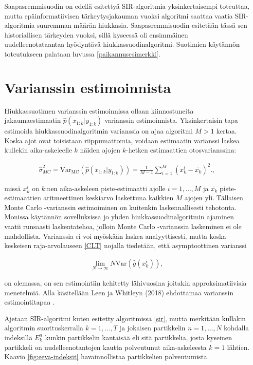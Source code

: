 \documentclass[
  12pt,
  a4paper, twoside]{book}
\begin{document}
Saapasremmisuodin on edellä esitettyä SIR-algoritmia yksinkertaisempi toteuttaa, mutta epäinformatiivisen tärkeytysjakauman vuoksi algoritmi saattaa vaatia SIR-algoritmia suuremman määrän hiukkasia. Saapasremmisuodin esitetään tässä sen historiallisen tärkeyden vuoksi, sillä kyseessä oli ensimmäinen uudelleenotataantaa hyödyntävä hiukkassuodinalgoritmi. Suotimien käytännön toteutukseen palataan luvussa \ref{paikannusesimerkki}.

\section{Varianssin estimoinnista} \label{varianssin-estimointi}

Hiukkassuotimen varianssin estimoinnissa ollaan kiinnostuneita jakaumaestimaatin \(\hat{p}(x_{1:k}|y_{1:k})\) varianssin estimoinnista. Yksinkertaisin tapa estimoida hiukkassuodinalgoritmin varianssia on ajaa algoritmi \(M > 1\) kertaa. Koska ajot ovat toisistaan riippumattomia, voidaan estimaatin varianssi laskea kullekin aika-askeleelle \(k\) näiden ajojen \(k\)-hetken estimaattien otosvarianssina:

\begin{align}\label{MC-varianssi}
\hat{\sigma}^2_{MC} = \text{Var}_{\text{MC}}(\hat{p}(x_{1:k}|y_{1:k})) = \frac{1}{M-1} \sum_{i=1}^{M}(x_k^i-\bar{x_k})^2.
,\end{align}

missä \(x_k^i\) on \(k\):nen aika-askeleen piste-estimaatti ajolle \(i=1,\ldots,M\) ja \(\bar{x_k}\) piste-estimaattien aritmeettinen keskiarvo laskettuna kaikkien \(M\) ajojen yli. Tällaisen Monte Carlo -varianssin estimoiminen on kuitenkin laskennallisesti tehotonta. Monissa käytännön sovelluksissa jo yhden hiukkassuodinalgoritmin ajaminen vaatii runsaasti laskentatehoa, jolloin Monte Carlo -varianssin laskeminen ei ole mahdollista. Varianssia ei voi myöskään laskea analyyttisesti, mutta koska keskeisen raja-arvolauseen \ref{CLT} nojalla tiedetään, että asymptoottinen varianssi

\begin{align}\label{asymptoottinen-varianssi}
\lim_{N\to \infty} N \text {Var}(\hat{g}(x_k^i))
,\end{align}

on olemassa, on sen estimointiin kehitetty lähivuosina joitakin approksimatiivisia menetelmiä. Alla käsitellään Leen ja Whitleyn (2018) ehdottamaa varianssin estimointitapaa \citep{Lee-2018}.

Ajetaan SIR-algoritmi kuten esitetty algoritmissa \ref{sir}, mutta merkitään kullakin algoritmin suorituskerralla \(k=1,\ldots,T\) ja jokaisen partikkelin \(n=1,\ldots,N\) kohdalla indeksillä \(E_k^n\) kunkin partikkelin kantaisää eli sitä partikkelia, josta kyseinen partikkeli on uudelleenotantojen kautta polveutunut aika-askeleesta \(k=1\) lähtien. Kaavio \ref{fig:eeva-indeksit} havainnollistaa partikkelien polveutumista.
\end{document}
